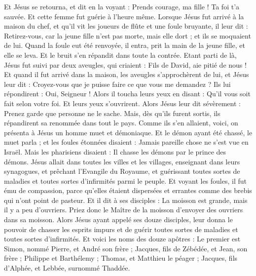 \begin{multicols}{2}
Et Jésus se retourna, et dit en la voyant : Prends courage, ma fille ! Ta foi t'a sauvée. Et cette femme fut guérie à l’heure même.
Lorsque Jésus fut arrivé à la maison du chef, et qu'il vit les joueurs de flûte et une foule bruyante,
il leur dit : Retirez-vous, car la jeune fille n'est pas morte, mais elle dort ; et ils se moquaient de lui.
Quand la foule eut été renvoyée, il entra, prit la main de la jeune fille, et elle se leva.
Et le bruit s'en répandit dans toute la contrée.
Etant parti de là, Jésus fut suivi par deux aveugles, qui criaient : Fils de David, aie pitié de nous !
Et quand il fut arrivé dans la maison, les aveugles s’approchèrent de lui, et Jésus leur dit : Croyez-vous que je puisse faire ce que vous me demandez ? Ils lui répondirent : Oui, Seigneur !
Alors il toucha leurs yeux en disant : Qu'il vous soit fait selon votre foi.
Et leurs yeux s’ouvrirent. Alors Jésus leur dit sévèrement : Prenez garde que personne ne le sache.
Mais, dès qu’ils furent sortis, ils répandirent sa renommée dans tout le pays.
Comme ils s’en allaient, voici, on présenta à Jésus un homme muet et démoniaque.
Et le démon ayant été chassé, le muet parla ; et les foules étonnées disaient : Jamais pareille chose ne s’est vue en Israël.
Mais les pharisiens disaient : Il chasse les démons par le prince des démons.
Jésus allait dans toutes les villes et les villages, enseignant dans leurs synagogues, et prêchant l'Evangile du Royaume, et guérissant toutes sortes de maladies et toutes sortes d'infirmités parmi le peuple.
Et voyant les foules, il fut ému de compassion, parce qu'elles étaient dispersées et errantes comme des brebis qui n'ont point de pasteur.
Et il dit à ses disciples : La moisson est grande, mais il y a peu d'ouvriers.
Priez donc le Maître de la moisson d’envoyer des ouvriers dans sa moisson.
\VerseOne{}Alors Jésus ayant appelé ses douze disciples, leur donna le pouvoir de chasser les esprits impurs et de guérir toutes sortes de maladies et toutes sortes d'infirmités.
Et voici les noms des douze apôtres : Le premier est Simon, nommé Pierre, et André son frère ; Jacques, fils de Zébédée, et Jean, son frère ;
Philippe et Barthélemy ; Thomas, et Matthieu le péager ; Jacques, fils d'Alphée, et Lebbée, surnommé Thaddée.

\end{multicols}
